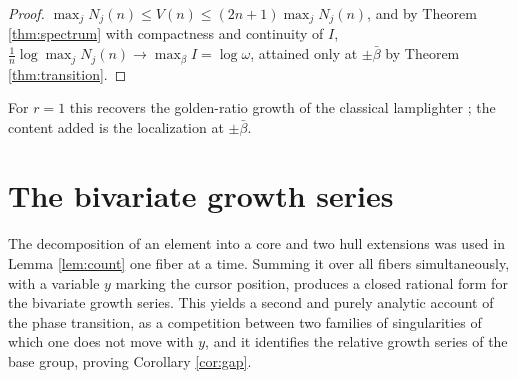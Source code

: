 \documentclass[11pt]{amsart}
\theoremstyle{definition}
\theoremstyle{remark}
\begin{document}
\begin{proof}
$\max_j N_j(n)\le V(n)\le(2n+1)\max_j N_j(n)$, and by Theorem \ref{thm:spectrum} with compactness and continuity of $I$, $\frac1n\log\max_jN_j(n)\to\max_\beta I=\log\omega$, attained only at $\pm\bar\beta$ by Theorem \ref{thm:transition}.
\end{proof}

For $r=1$ this recovers the golden-ratio growth of the classical lamplighter \cite{Parry92,LPP96}; the content added is the localization at $\pm\bar\beta$.

\section{The bivariate growth series}\label{sec:series}

The decomposition of an element into a core and two hull extensions was used in Lemma \ref{lem:count} one fiber at a time. Summing it over all fibers simultaneously, with a variable $y$ marking the cursor position, produces a closed rational form for the bivariate growth series. This yields a second and purely analytic account of the phase transition, as a competition between two families of singularities of which one does not move with $y$, and it identifies the relative growth series of the base group, proving Corollary \ref{cor:gap}.
\end{document}
